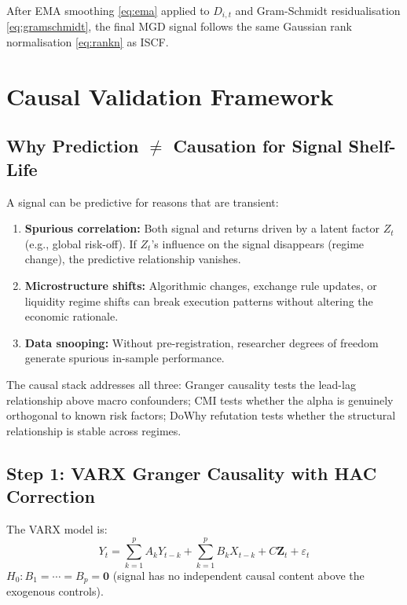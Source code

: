 \documentclass[12pt,a4paper]{article}
\begin{document}
After EMA smoothing \eqref{eq:ema} applied to $D_{i,t}$ and Gram-Schmidt residualisation \eqref{eq:gramschmidt}, the final MGD signal follows the same Gaussian rank normalisation \eqref{eq:rankn} as ISCF.

\section{Causal Validation Framework}
\label{sec:causal}

\subsection{Why Prediction $\neq$ Causation for Signal Shelf-Life}

A signal can be predictive for reasons that are transient:
\begin{enumerate}
  \item \textbf{Spurious correlation:} Both signal and returns driven by a latent factor $Z_t$ (e.g., global risk-off). If $Z_t$'s influence on the signal disappears (regime change), the predictive relationship vanishes.
  \item \textbf{Microstructure shifts:} Algorithmic changes, exchange rule updates, or liquidity regime shifts can break execution patterns without altering the economic rationale.
  \item \textbf{Data snooping:} Without pre-registration, researcher degrees of freedom generate spurious in-sample performance.
\end{enumerate}

The causal stack addresses all three: Granger causality tests the lead-lag relationship above macro confounders; CMI tests whether the alpha is genuinely orthogonal to known risk factors; DoWhy refutation tests whether the structural relationship is stable across regimes.

\subsection{Step 1: VARX Granger Causality with HAC Correction}

The VARX model is:
\begin{equation}
  Y_t = \sum_{k=1}^{p} A_k Y_{t-k} + \sum_{k=1}^{p} B_k X_{t-k} + C\mathbf{Z}_t + \varepsilon_t
  \label{eq:varx}
\end{equation}
$H_0: B_1 = \cdots = B_p = \mathbf{0}$ (signal has no independent causal content above the exogenous controls).
\end{document}
